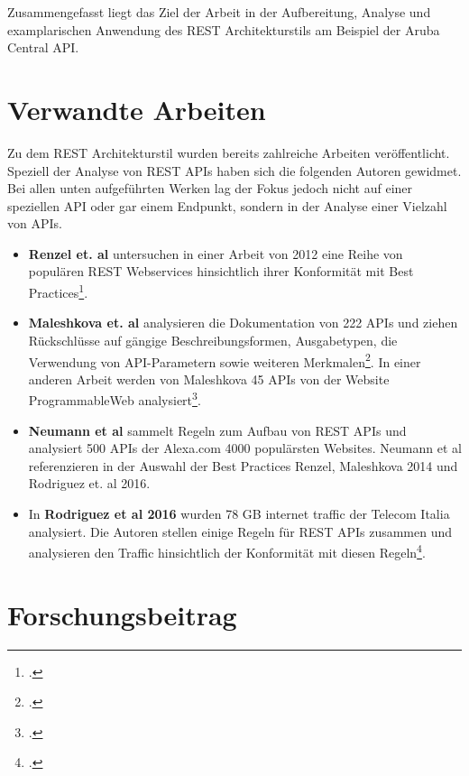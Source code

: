 Zusammengefasst liegt das Ziel der Arbeit in der Aufbereitung, Analyse und examplarischen Anwendung des REST Architekturstils am Beispiel der Aruba Central API.

\section{Verwandte Arbeiten}

Zu dem REST Architekturstil wurden bereits zahlreiche Arbeiten veröffentlicht. Speziell der Analyse von REST APIs haben sich die folgenden Autoren gewidmet. Bei allen unten aufgeführten Werken lag der Fokus jedoch nicht auf einer speziellen API oder gar einem Endpunkt, sondern in der Analyse einer Vielzahl von APIs.

\begin{itemize}
    \item \textbf{Renzel et. al} untersuchen in einer Arbeit von 2012 eine Reihe von populären REST Webservices hinsichtlich ihrer Konformität mit Best Practices\footcite[Vgl. ][]{hutchison_todays_2012}.

    \item \textbf{Maleshkova et. al} analysieren die Dokumentation von 222 APIs und ziehen Rückschlüsse auf gängige Beschreibungsformen, Ausgabetypen, die Verwendung von API-Parametern sowie weiteren Merkmalen\footcite[Vgl. ][]{maleshkova_investigating_2010}. In einer anderen Arbeit werden von Maleshkova 45 APIs von der Website ProgrammableWeb analysiert\footcite[Vgl. ][]{presutti_restful_2014}. 

    \item \textbf{Neumann et al} sammelt Regeln zum Aufbau von REST APIs und analysiert 500 APIs der Alexa.com 4000 populärsten Websites. Neumann et al referenzieren in der Auswahl der Best Practices Renzel, Maleshkova 2014 und Rodriguez et. al 2016.

    \item In \textbf{Rodriguez et al 2016} wurden 78 GB internet traffic der Telecom Italia analysiert. Die Autoren stellen einige Regeln für REST APIs zusammen und analysieren den Traffic hinsichtlich der Konformität mit diesen Regeln\footcite[Vgl. ][]{rodriguez_rest_2016}. 

\end{itemize}

\section{Forschungsbeitrag}

